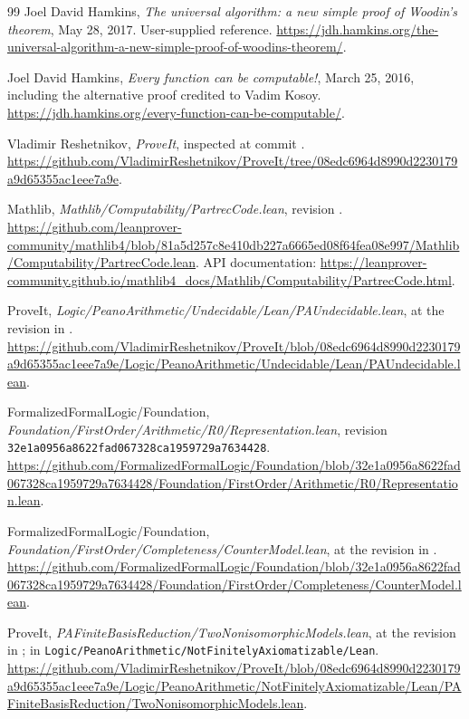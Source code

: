 \documentclass[11pt]{article}
\theoremstyle{definition}
\theoremstyle{remark}
\begin{document}
\begin{thebibliography}{99}
\small
{}
Joel David Hamkins,
\emph{The universal algorithm: a new simple proof of Woodin's theorem},
May 28, 2017. User-supplied reference.
\url{https://jdh.hamkins.org/the-universal-algorithm-a-new-simple-proof-of-woodins-theorem/}.

Joel David Hamkins,
\emph{Every function can be computable!}, March 25, 2016,
including the alternative proof credited to Vadim Kosoy.
\url{https://jdh.hamkins.org/every-function-can-be-computable/}.

Vladimir Reshetnikov, \emph{ProveIt}, inspected at commit
.
\url{https://github.com/VladimirReshetnikov/ProveIt/tree/08edc6964d8990d2230179a9d65355ac1eee7a9e}.

Mathlib, \emph{Mathlib/Computability/PartrecCode.lean},
revision .
\url{https://github.com/leanprover-community/mathlib4/blob/81a5d257c8e410db227a6665ed08f64fea08e997/Mathlib/Computability/PartrecCode.lean}.
API documentation:
\url{https://leanprover-community.github.io/mathlib4_docs/Mathlib/Computability/PartrecCode.html}.

ProveIt, \emph{Logic/PeanoArithmetic/Undecidable/Lean/PAUndecidable.lean},
at the revision in \cite{ProveIt}.
\url{https://github.com/VladimirReshetnikov/ProveIt/blob/08edc6964d8990d2230179a9d65355ac1eee7a9e/Logic/PeanoArithmetic/Undecidable/Lean/PAUndecidable.lean}.

FormalizedFormalLogic/Foundation,
\emph{Foundation/FirstOrder/Arithmetic/R0/Representation.lean},
revision \texttt{32e1a0956a8622fad067328ca1959729a7634428}.
\url{https://github.com/FormalizedFormalLogic/Foundation/blob/32e1a0956a8622fad067328ca1959729a7634428/Foundation/FirstOrder/Arithmetic/R0/Representation.lean}.

FormalizedFormalLogic/Foundation,
\emph{Foundation/FirstOrder/Completeness/CounterModel.lean},
at the revision in \cite{FoundationRepresentation}.
\url{https://github.com/FormalizedFormalLogic/Foundation/blob/32e1a0956a8622fad067328ca1959729a7634428/Foundation/FirstOrder/Completeness/CounterModel.lean}.

ProveIt,
\emph{PAFiniteBasisReduction/TwoNonisomorphicModels.lean},
at the revision in \cite{ProveIt}; in
\texttt{Logic/PeanoArithmetic/NotFinitelyAxiomatizable/Lean}.
\url{https://github.com/VladimirReshetnikov/ProveIt/blob/08edc6964d8990d2230179a9d65355ac1eee7a9e/Logic/PeanoArithmetic/NotFinitelyAxiomatizable/Lean/PAFiniteBasisReduction/TwoNonisomorphicModels.lean}.
\end{thebibliography}
\end{document}
